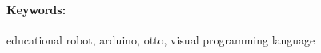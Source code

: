 \documentclass[12pt, twoside]{book}
\begin{document}
\paragraph*{Keywords:} educational robot, arduino, otto, visual programming language


%
%



\newpage 

\tableofcontents



\newpage 

\listoffigures


\mainmatter



 









\newpage	

\backmatter

\thispagestyle{empty}
\clearpage


 

 

\end{document}
